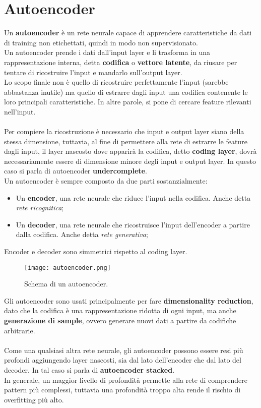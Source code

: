 \section{Autoencoder}
Un \textbf{autoencoder} è un rete neurale capace di apprendere caratteristiche da dati di training non etichettati, quindi in modo non supervisionato.\\
Un autoencoder prende i dati dall'input layer e li trasforma in una rappresentazione interna, detta \textbf{codifica} o \textbf{vettore latente}, da riusare per tentare di ricostruire l'input e mandarlo sull'output layer.\\
Lo scopo finale non è quello di ricostruire perfettamente l'input (sarebbe abbastanza inutile) ma quello di estrarre dagli input una codifica contenente le loro principali caratteristiche. In altre parole, si pone di cercare feature rilevanti nell'input.\\
\\
Per compiere la ricostruzione è necessario che input e output layer siano della stessa dimensione, tuttavia, al fine di permettere alla rete di estrarre le feature dagli input, il layer nascosto dove apparirà la codifica, detto \textbf{coding layer}, dovrà necessariamente essere di dimensione minore degli input e output layer. In questo caso si parla di autoencoder \textbf{undercomplete}.\\
Un autoencoder è sempre composto da due parti sostanzialmente:
\begin{itemize}
	\item Un \textbf{encoder}, una rete neurale che riduce l'input nella codifica. Anche detta \textit{rete ricognitica};
	\item Un \textbf{decoder}, una rete neurale che ricostruisce l'input dell'encoder a partire dalla codifica. Anche detta \textit{rete generativa};
\end{itemize}
Encoder e decoder sono simmetrici rispetto al coding layer.
\begin{figure}[H]
	\centering
	\texttt{[image: autoencoder.png]}
	\caption{Schema di un autoencoder.}
	\label{fig:autoencoder}
\end{figure}
Gli autoencoder sono usati principalmente per fare \textbf{dimensionality reduction}, dato che la codifica è una rappresentazione ridotta di ogni input, ma anche \textbf{generazione di sample}, ovvero generare nuovi dati a partire da codifiche arbitrarie.\\
\\
Come una qualsiasi altra rete neurale, gli autoencoder possono essere resi più profondi aggiungendo layer nascosti, sia dal lato dell'encoder che dal lato del decoder. In tal caso si parla di \textbf{autoencoder stacked}.\\
In generale, un maggior livello di profondità permette alla rete di comprendere pattern più complessi, tuttavia una profondità troppo alta rende il rischio di overfitting più alto.


